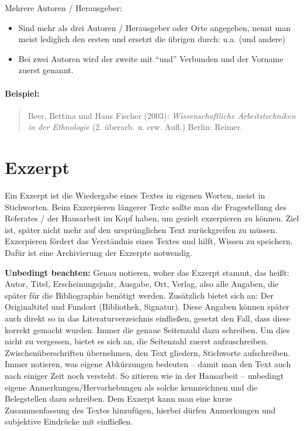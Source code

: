 \documentclass[ 12pt,
                titlepage,
                parskip=half,
                version=first,
                bibliography=totocnumbered,
                final,
                listof=totoc]{scrartcl}
\begin{document}
\begin{description}
    \item[Mehrere Autoren / Herausgeber:]
\end{description}
\begin{itemize}
    \item Sind mehr als drei Autoren / Herausgeber oder Orte angegeben, nennt
    man meist lediglich den ersten und ersetzt die übrigen durch: u.a. (und
    andere)
    \item Bei zwei Autoren wird der zweite mit \enquote{und} Verbunden und der
    Vorname zuerst genannt.
\end{itemize}

\paragraph{Beispiel:}
\begin{quote}
Beer, Bettina und Hans Fischer (2003): \emph{Wissenschaftliche Arbeitstechniken
in der Ethnologie} (2. überarb. u. erw. Aufl.) Berlin: Reimer.
\end{quote}

\section{Exzerpt}
\label{sec:exzerpt}

Ein Exzerpt ist die Wiedergabe eines Textes in eigenen Worten, meist in
Stichworten. Beim Exzerpieren längerer Texte sollte man die Fragestellung des
Referates / der Hausarbeit im Kopf haben, um gezielt exzerpieren zu können. Ziel
ist, später nicht mehr auf den ursprünglichen Text zurückgreifen zu müssen.
Exzerpieren fördert das Verständnis eines Textes und hilft, Wissen zu speichern.
Dafür ist eine Archivierung der Exzerpte notwendig.

\textbf{Unbedingt beachten:} Genau notieren, woher das Exzerpt stammt, das
heißt: Autor, Titel, Erscheinungsjahr, Ausgabe, Ort, Verlag, also alle Angaben,
die später für die Bibliographie benötigt werden. Zusätzlich bietet sich an: Der
Originaltitel und Fundort (Bibliothek, Signatur). Diese Angaben können später
auch direkt so in das Literaturverzeichnis einfließen, gesetzt den Fall, dass
diese korrekt gemacht wurden. Immer die genaue Seitenzahl dazu schreiben. Um
dies nicht zu vergessen, bietet es sich an, die Seitenzahl zuerst
aufzuschreiben. Zwischenüberschriften übernehmen, den Text gliedern, Stichworte
aufschreiben. Immer notieren, was eigene Abkürzungen bedeuten -- damit man den
Text auch nach einiger Zeit noch versteht. So zitieren wie in der Hausarbeit --
unbedingt eigene Anmerkungen/Hervorhebungen als solche kennzeichnen und die
Belegstellen dazu schreiben. Dem Exzerpt kann man eine kurze Zusammenfassung des
Textes hinzufügen, hierbei dürfen Anmerkungen und subjektive Eindrücke mit
einfließen.
\end{document}
